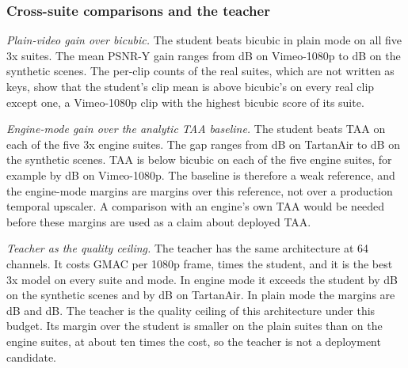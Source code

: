 \subsubsection{Cross-suite comparisons and the teacher}\label{sec:tsrr-main-summary}

\emph{Plain-video gain over bicubic.} The student beats bicubic in plain mode on all five 3x suites. The mean PSNR-Y gain ranges from  dB on Vimeo-1080p to  dB on the synthetic scenes. \Preliminary{} The per-clip counts of the real suites, which are not written as keys, show that the student's clip mean is above bicubic's on every real clip except one, a Vimeo-1080p clip with the highest bicubic score of its suite.

\emph{Engine-mode gain over the analytic TAA baseline.} The student beats TAA on each of the five 3x engine suites. The gap ranges from  dB on TartanAir to  dB on the synthetic scenes. TAA is below bicubic on each of the five engine suites, for example by  dB on Vimeo-1080p. \Observation{} The baseline is therefore a weak reference, and the engine-mode margins are margins over this reference, not over a production temporal upscaler. A comparison with an engine's own TAA would be needed before these margins are used as a claim about deployed TAA.

\emph{Teacher as the quality ceiling.} The teacher has the same architecture at 64 channels. It costs  GMAC per 1080p frame,  times the  student, and it is the best 3x model on every suite and mode. In engine mode it exceeds the student by  dB on the synthetic scenes and by  dB on TartanAir. In plain mode the margins are  dB and  dB. \Preliminary{} The teacher is the quality ceiling of this architecture under this budget. Its margin over the student is smaller on the plain suites than on the engine suites, at about ten times the cost, so the teacher is not a deployment candidate.

